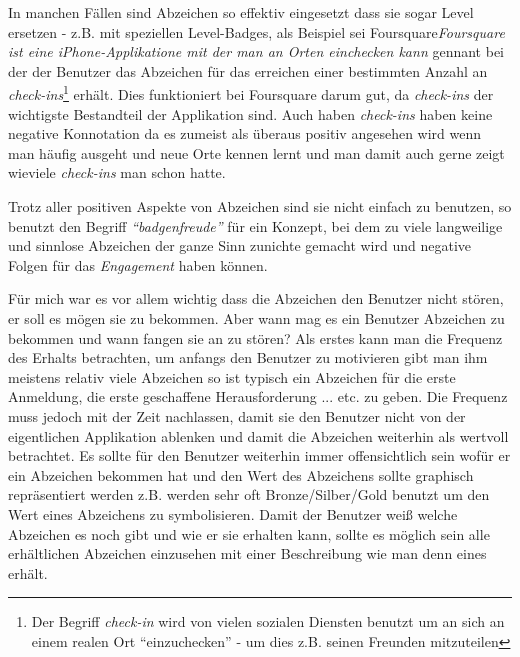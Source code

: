 \documentclass[12pt,twoside]{book}
\begin{document}
In manchen Fällen sind Abzeichen so effektiv eingesetzt dass sie sogar Level ersetzen - z.B. mit speziellen Level-Badges, als Beispiel sei Foursquare\textit{Foursquare ist eine iPhone-Applikatione mit der man an Orten \textit{einchecken} kann} gennant bei der der Benutzer das Abzeichen für das erreichen einer bestimmten Anzahl an \textit{check-ins}\footnote{Der Begriff \textit{check-in} wird von vielen sozialen Diensten benutzt um an sich an einem realen Ort ``einzuchecken'' - um dies z.B. seinen Freunden mitzuteilen} erhält. Dies funktioniert bei Foursquare darum gut, da \textit{check-ins} der wichtigste Bestandteil der Applikation sind.  Auch haben \textit{check-ins} haben keine negative Konnotation da es zumeist als überaus positiv angesehen wird wenn man häufig ausgeht und neue Orte kennen lernt und man damit auch gerne zeigt wieviele \textit{check-ins} man schon hatte.

Trotz aller positiven Aspekte von Abzeichen sind sie nicht einfach zu benutzen, so benutzt \citep{zichermann2011gamification} den Begriff \textit{``badgenfreude''} für ein Konzept, bei dem zu viele langweilige und sinnlose Abzeichen der ganze Sinn zunichte gemacht wird und negative Folgen für das \textit{Engagement} haben können.

Für mich war es vor allem wichtig dass die Abzeichen den Benutzer nicht stören, er soll es mögen sie zu bekommen. Aber wann mag es ein Benutzer Abzeichen zu bekommen und wann fangen sie an zu stören?
Als erstes kann man die Frequenz des Erhalts betrachten, um anfangs den Benutzer zu motivieren gibt man ihm meistens relativ viele Abzeichen so ist typisch ein Abzeichen für die erste Anmeldung, die erste geschaffene Herausforderung ... etc. zu geben.
Die Frequenz muss jedoch mit der Zeit nachlassen, damit sie den Benutzer nicht von der eigentlichen Applikation ablenken und damit die Abzeichen weiterhin als wertvoll betrachtet.
Es sollte für den Benutzer weiterhin immer offensichtlich sein wofür er ein Abzeichen bekommen hat und den Wert des Abzeichens sollte graphisch repräsentiert werden z.B. werden sehr oft Bronze/Silber/Gold benutzt um den Wert eines Abzeichens zu symbolisieren.
Damit der Benutzer weiß welche Abzeichen es noch gibt und wie er sie erhalten kann, sollte es möglich sein alle erhältlichen Abzeichen einzusehen mit einer Beschreibung wie man denn eines erhält.
\end{document}
